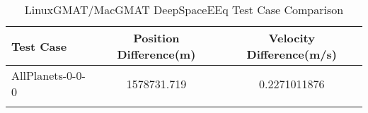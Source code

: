 \begin{table}[htbp!]
\centering
\caption{ LinuxGMAT/MacGMAT DeepSpaceEEq Test Case Comparison}
      \begin{tabular}{lcc}
      \hline\hline
          Test Case & Position Difference(m) & Velocity Difference(m/s) \\
         \hline
         AllPlanets-0-0-0 & 1578731.719 & 0.2271011876 \\
      \hline\hline
      \label{Table: DeepSpaceEEq LinuxGMAT-MacGMAT Table} 
\end{tabular}
\end{table}
